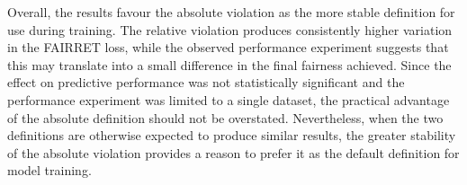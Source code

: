 Overall, the results favour the absolute violation as the more stable definition for use during training. The relative violation produces consistently higher variation in the FAIRRET loss, while the observed performance experiment suggests that this may translate into a small difference in the final fairness achieved. Since the effect on predictive performance was not statistically significant and the performance experiment was limited to a single dataset, the practical advantage of the absolute definition should not be overstated. Nevertheless, when the two definitions are otherwise expected to produce similar results, the greater stability of the absolute violation provides a reason to prefer it as the default definition for model training.